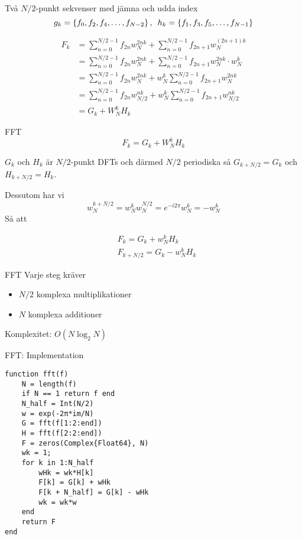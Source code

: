 \documentclass[presentation]{beamer}
\begin{document}
\begin{frame}[label={sec:org176764c}]{Två \(N/2\)-punkt sekvenser med jämna och udda index}
\[
  g_{k} = \left\{f_{0}, f_{2}, f_{4}, \dots, f_{N-2}\right\}, \hspace{0.5em}
  h_{k} = \left\{f_{1}, f_{3}, f_{5}, \dots, f_{N-1}\right\} 
\]

\begin{align*}
F_{k} &= \sum_{n=0}^{N/2 - 1}f_{2n}w_{N}^{2nk} + \sum_{n=0}^{N/2 -
  1}f_{2n + 1}w_{N}^{(2n+1)k} \\
  &= \sum_{n=0}^{N/2 - 1}f_{2n}w_{N}^{2nk} + \sum_{n=0}^{N/2 -
    1}f_{2n+1} w_{N}^{2nk} \cdot w_{N}^{k} \\
    &= \sum_{n=0}^{N/2 - 1}f_{2n}w_{N}^{2nk} + w_{N}^{k} \sum_{n=0}^{N/2 -
      1}f_{2n+1} w_{N}^{2nk} \\
      &= \sum_{n=0}^{N/2 - 1}f_{2n}w_{N/2}^{nk} + w_{N}^{k} \sum_{n=0}^{N/2 -
        1}f_{2n+1} w_{N/2}^{nk} \\
  & = G_{k} + W_{N}^{k}H_{k}
\end{align*}
\end{frame}

\begin{frame}[label={sec:org52f1586}]{FFT}
\[ F_{k} = G_{k} + W_{N}^{k}H_{k} \]

\(G_{k}\) och \(H_{k}\) är \(N/2\)-punkt DFTs och därmed \(N/2\) periodiska så
\(G_{k + N/2} = G_{k}\) och \(H_{k + N/2} = H_{k}\).

Dessutom har vi
\[ w_{N}^{k + N/2} = w_{N}^{k}w_{N}^{N/2} = e^{-i2 \pi}w_{N}^{k} = -w_{N}^{k} \]
Så att  

\begin{align*}
&F_{k} = G_{k} + w_{N}^{k}H_{k} \\
&F_{k + N/2} = G_{k} - w_{N}^{k}H_{k}
\end{align*}
\end{frame}

\begin{frame}[label={sec:orgbb7cc38}]{FFT}
Varje steg kräver
\begin{itemize}
\item \(N/2\) komplexa multiplikationer
\item \(N\) komplexa additioner
\end{itemize}

Komplexitet: \(O(N \log_2{N})\)
\end{frame}

\begin{frame}[label={sec:orgab39df4},fragile]{FFT: Implementation}
 \begin{verbatim}
function fft(f)
    N = length(f)
    if N == 1 return f end
    N_half = Int(N/2)
    w = exp(-2π*im/N)
    G = fft(f[1:2:end])
    H = fft(f[2:2:end])
    F = zeros(Complex{Float64}, N)
    wk = 1;
    for k in 1:N_half
        wHk = wk*H[k]
        F[k] = G[k] + wHk
        F[k + N_half] = G[k] - wHk
        wk = wk*w
    end
    return F
end
\end{verbatim}
\end{frame}
\end{document}
